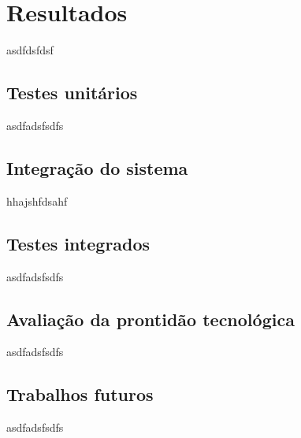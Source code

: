 \chapter{Resultados}
\label{chap:result}
asdfdsfdsf

\section{Testes unitários}
\label{sec:testu}
asdfadsfsdfs

\section{Integração do sistema}
\label{sec:intsis}
hhajshfdsahf

\section{Testes integrados}
\label{sec:testi}
asdfadsfsdfs

\section{Avaliação da prontidão tecnológica}
\label{sec:trl}
asdfadsfsdfs

\section{Trabalhos futuros}
\label{sec:trabfut}
asdfadsfsdfs





